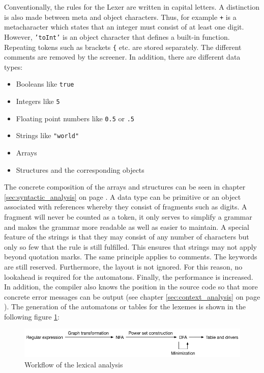 Conventionally, the rules for the Lexer are written in capital letters. A distinction is also made between meta and object characters. Thus, for example \texttt{+} is a metacharacter which states that an integer must consist of at least one digit. However, \texttt{'toInt'} is an object character that defines a built-in function. Repeating tokens such as brackets \texttt{\{} etc. are stored separately. The different comments are removed by the screener. In addition, there are different data types:

\begin{itemize}
	\item Booleans like \texttt{true}
	\item Integers like \texttt{5}
	\item Floating point numbers like \texttt{0.5} or \texttt{.5}
	\item Strings like \texttt{"world"}
	\item Arrays
	\item Structures and the corresponding objects
\end{itemize}

The concrete composition of the arrays and structures can be seen in chapter \ref{sec:syntactic_analysis} on page \pageref{sec:syntactic_analysis}. A data type can be primitive or an object associated with references whereby they consist of fragments such as digits. A fragment will never be counted as a token, it only serves to simplify a grammar and makes the grammar more readable as well as easier to maintain. A special feature of the strings is that they may consist of any number of characters but only so few that the rule is still fulfilled. This ensures that strings may not apply beyond quotation marks. The same principle applies to comments. The keywords are still reserved. Furthermore, the layout is not ignored. For this reason, no lookahead is required for the automatons. Finally, the performance is increased.
In addition, the compiler also knows the position in the source code so that more concrete error messages can be output (see chapter \ref{sec:context_analysis} on page \pageref{sec:context_analysis}). The generation of the automatons or tables for the lexemes is shown in the following figure \ref{fig:lexical_analysis}:

\begin{figure}[bth]
	\centering
	\includegraphics[scale=0.5]{./img/lexical_analysis}
	\caption[Workflow of the lexical analysis]{Workflow of the lexical analysis}
	\label{fig:lexical_analysis}
\end{figure}
\noindent

